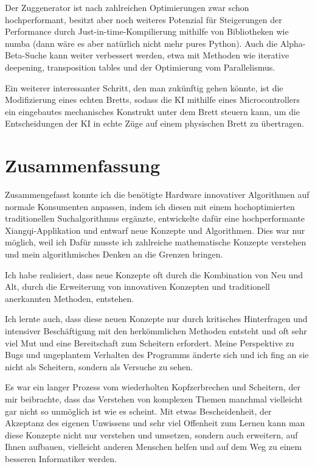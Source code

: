 \documentclass{jpp}
\begin{document}
Der Zuggenerator ist nach zahlreichen Optimierungen zwar schon hochperformant, besitzt aber noch weiteres Potenzial für Steigerungen der Performance durch Just-in-time-Kompilierung mithilfe von Bibliotheken wie numba (dann wäre es aber natürlich nicht mehr pures Python). Auch die Alpha-Beta-Suche kann weiter verbessert werden, etwa mit Methoden wie iterative deepening, transposition tables und der Optimierung vom Parallelismus.

Ein weiterer interessanter Schritt, den man zukünftig gehen könnte, ist die Modifizierung eines echten Bretts, sodass die KI mithilfe eines Microcontrollers ein eingebautes mechanisches Konstrukt unter dem Brett steuern kann, um die Entscheidungen der KI in echte Züge auf einem physischen Brett zu übertragen.

\section{Zusammenfassung}
Zusammengefasst konnte ich die benötigte Hardware innovativer Algorithmen auf normale Konsumenten anpassen, indem ich diesen mit einem hochoptimierten traditionellen Suchalgorithmus ergänzte, entwickelte dafür eine hochperformante Xiangqi-Applikation und entwarf neue Konzepte und Algorithmen. Dies war nur möglich, weil ich  Dafür musste ich zahlreiche mathematische Konzepte verstehen und mein algorithmisches Denken an die Grenzen bringen. 

Ich habe realisiert, dass neue Konzepte oft durch die Kombination von Neu und Alt, durch die Erweiterung von innovativen Konzepten und traditionell anerkannten Methoden, entstehen.

Ich lernte auch, dass diese neuen Konzepte nur durch kritisches Hinterfragen und intensiver Beschäftigung mit den herkömmlichen Methoden entsteht und oft sehr viel Mut und eine Bereitschaft zum Scheitern erfordert. Meine Perspektive zu Bugs und ungeplantem Verhalten des Programms änderte sich und ich fing an sie nicht als Scheitern, sondern als Versuche zu sehen.  

Es war ein langer Prozess vom wiederholten Kopfzerbrechen und Scheitern, der mir beibrachte, dass das Verstehen von komplexen Themen manchmal vielleicht gar nicht so unmöglich ist wie es scheint. Mit etwas Bescheidenheit, der Akzeptanz des eigenen Unwissens und sehr viel Offenheit zum Lernen kann man diese Konzepte nicht nur verstehen und umsetzen, sondern auch erweitern, auf Ihnen aufbauen, vielleicht anderen Menschen helfen und auf dem Weg zu einem besseren Informatiker werden.
\end{document}
